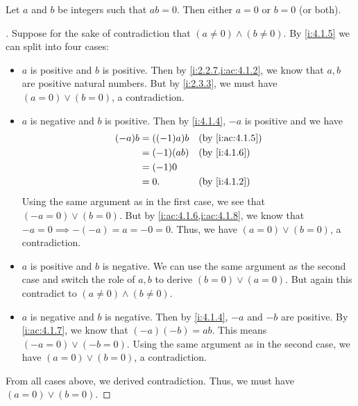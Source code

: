 \begin{prop}\label{i:4.1.8}
  Let \(a\) and \(b\) be integers such that \(ab = 0\).
  Then either \(a = 0\) or \(b = 0\) (or both).
\end{prop}

\begin{proof}[]
  Suppose for the sake of contradiction that \((a \neq 0) \land (b \neq 0)\).
  By \cref{i:4.1.5} we can split into four cases:
  \begin{itemize}
    \item \(a\) is positive and \(b\) is positive.
          Then by \cref{i:2.2.7,i:ac:4.1.2}, we know that \(a, b\) are positive natural numbers.
          But by \cref{i:2.3.3}, we must have \((a = 0) \lor (b = 0)\), a contradiction.
    \item \(a\) is negative and \(b\) is positive.
          Then by \cref{i:4.1.4}, \(-a\) is positive and we have
          \begin{align*}
            (-a) b & = ((-1) a) b &  & \by{i:ac:4.1.5} \\
                   & = (-1) (ab)  &  & \by{i:4.1.6}    \\
                   & = (-1) 0                          \\
                   & = 0.         &  & \by{i:4.1.2}
          \end{align*}
          Using the same argument as in the first case, we see that \((-a = 0) \lor (b = 0)\).
          But by \cref{i:ac:4.1.6,i:ac:4.1.8}, we know that \(-a = 0 \implies -(-a) = a = -0 = 0\).
          Thus, we have \((a = 0) \lor (b = 0)\), a contradiction.
    \item \(a\) is positive and \(b\) is negative.
          We can use the same argument as the second case and switch the role of \(a, b\) to derive \((b = 0) \lor (a = 0)\).
          But again this contradict to \((a \neq 0) \land (b \neq 0)\).
    \item \(a\) is negative and \(b\) is negative.
          Then by \cref{i:4.1.4}, \(-a\) and \(-b\) are positive.
          By \cref{i:ac:4.1.7}, we know that \((-a)(-b) = ab\).
          This means \((-a = 0) \lor (-b = 0)\).
          Using the same argument as in the second case, we have \((a = 0) \lor (b = 0)\), a contradiction.
  \end{itemize}
  From all cases above, we derived contradiction.
  Thus, we must have \((a = 0) \lor (b = 0)\).
\end{proof}

